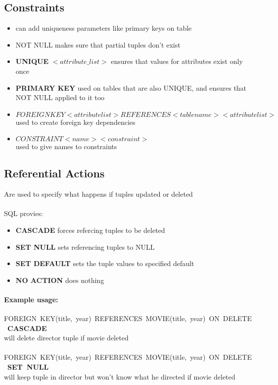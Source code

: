 \documentclass{article}
\begin{document}
	\subsection{Constraints}
		\begin{itemize}
			\item can add uniqueness parameters like primary keys on table
			\item NOT NULL makes sure that partial tuples don't exist
			\item \textbf{UNIQUE} $<attribute\_list>$ ensures that values for attributes exist only once
			\item \textbf{PRIMARY KEY} used on tables that are also UNIQUE, and ensures that NOT NULL applied to it too
			\item \mbox{$FOREIGN KEY <attributelist> REFERENCES <tablename> <attributelist>$}  used to create foreign key dependencies
			\item $CONSTRAINT <name> <constraint>$ \\used to give names to constraints
		\end{itemize}

	\subsection{Referential Actions}
		Are used to specify what happens if tuples updated or deleted
		\\ \\ SQL provies:
		\begin{itemize}
			\item \textbf{CASCADE} forces refercing tuples to be deleted
			\item \textbf{SET NULL} sets referencing tuples to NULL
			\item \textbf{SET DEFAULT} sets the tuple values to specified default
			\item \textbf{NO ACTION} does nothing
		\end{itemize}

		\paragraph{Example usage:}
		\mbox{FOREIGN KEY(title, year) REFERENCES MOVIE(title, year) ON DELETE \textbf{CASCADE}} \\ will delete director tuple if movie deleted
		\\\\ \mbox{FOREIGN KEY(title, year) REFERENCES MOVIE(title, year) ON DELETE \textbf{SET NULL}} \\ will keep tuple in director but won't know what he directed if movie deleted
\end{document}
